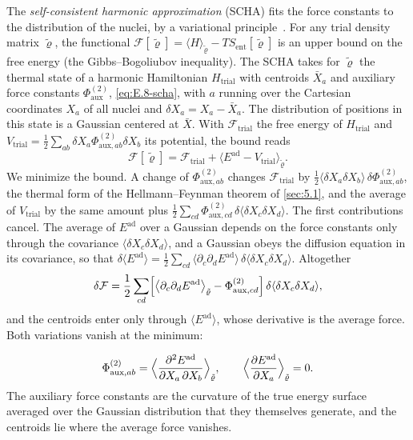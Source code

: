 The \emph{self-consistent harmonic approximation} (SCHA) fits the force constants to the distribution of the nuclei, by a variational principle~\cite{errea2014anharmonic}. For any trial density matrix $\tilde\varrho$, the functional $\mathcal{F}[\tilde\varrho] = \langle H\rangle_{\tilde\varrho} - TS_{\mathrm{ent}}[\tilde\varrho]$ is an upper bound on the free energy (the Gibbs--Bogoliubov inequality). The SCHA takes for $\tilde\varrho$ the thermal state of a harmonic Hamiltonian $H_{\mathrm{trial}}$ with centroids $\bar X_a$ and auxiliary force constants $\Phi^{(2)}_{\mathrm{aux}}$, \cref{eq:E.8-scha}, with $a$ running over the Cartesian coordinates $X_a$ of all nuclei and $\delta X_a = X_a - \bar X_a$. The distribution of positions in this state is a Gaussian centered at $\bar X$. With $\mathcal{F}_{\mathrm{trial}}$ the free energy of $H_{\mathrm{trial}}$ and $V_{\mathrm{trial}} = \tfrac12\sum_{ab}\delta X_a\Phi^{(2)}_{\mathrm{aux},ab}\delta X_b$ its potential, the bound reads
\begin{equation*}
  \mathcal{F}[\tilde\varrho] = \mathcal{F}_{\mathrm{trial}} + \bigl\langle E^{\mathrm{ad}} - V_{\mathrm{trial}}\bigr\rangle_{\tilde\varrho} .
\end{equation*}
We minimize the bound. A change of $\Phi^{(2)}_{\mathrm{aux},ab}$ changes $\mathcal{F}_{\mathrm{trial}}$ by $\tfrac12\langle\delta X_a\delta X_b\rangle\,\delta\Phi^{(2)}_{\mathrm{aux},ab}$, the thermal form of the Hellmann--Feynman theorem of \cref{sec:5.1}, and the average of $V_{\mathrm{trial}}$ by the same amount plus $\tfrac12\sum_{cd}\Phi^{(2)}_{\mathrm{aux},cd}\,\delta\langle\delta X_c\delta X_d\rangle$. The first contributions cancel. The average of $E^{\mathrm{ad}}$ over a Gaussian depends on the force constants only through the covariance $\langle\delta X_c\delta X_d\rangle$, and a Gaussian obeys the diffusion equation in its covariance, so that $\delta\langle E^{\mathrm{ad}}\rangle = \tfrac12\sum_{cd}\langle\partial_c\partial_dE^{\mathrm{ad}}\rangle\,\delta\langle\delta X_c\delta X_d\rangle$. Altogether
\begin{equation*}
  \delta\mathcal{F} = \frac12\sum_{cd}\Bigl[\bigl\langle\partial_c\partial_dE^{\mathrm{ad}}\bigr\rangle_{\tilde\varrho} - \Phi^{(2)}_{\mathrm{aux},cd}\Bigr]\,\delta\langle\delta X_c\delta X_d\rangle ,
\end{equation*}
and the centroids enter only through $\langle E^{\mathrm{ad}}\rangle$, whose derivative is the average force. Both variations vanish at the minimum:
\begin{keyresult}
\begin{equation}
  \Phi^{(2)}_{\mathrm{aux},ab} = \Bigl\langle\frac{\partial^2E^{\mathrm{ad}}}{\partial X_a\,\partial X_b}\Bigr\rangle_{\tilde\varrho} , \qquad
  \Bigl\langle\frac{\partial E^{\mathrm{ad}}}{\partial X_a}\Bigr\rangle_{\tilde\varrho} = 0 .
  \label{eq:5.7-scha}
\end{equation}
The auxiliary force constants are the curvature of the true energy surface averaged over the Gaussian distribution that they themselves generate, and the centroids lie where the average force vanishes.
\end{keyresult}
